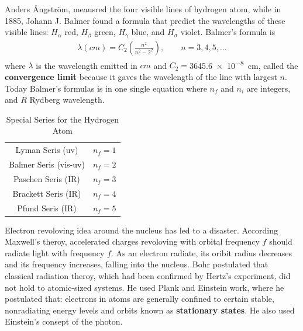         \bulletpar Anders \AA ngstr\"om, meausred the four visible lines of hydrogen atom, while in 1885, Johann J. Balmer found a formula that predict the wavelengths
        of these visible lines: $H_\alpha$ red, $H_\beta$ green, $H_\gamma$ blue, and $H_\sigma$ violet. Balmer's formula is
        \begin{align}
            \label{eq:Balmer formula:1}
            \lambda(cm) = C_2 \left( \frac{n^2}{n^2 - 2^2} \right), \qquad n=3, 4, 5, \dots 
        \end{align}
        where $\lambda$ is the wavelength emitted in $cm$ and $C_2=$\SI{3645.6e-8}{cm}, called the \textbf{convergence limit} because it gaves the wavelength of the line 
        with largest $n$. Today Balmer's formulas is in one single equation 
        where $n_f$ and $n_i$ are integers, and $R$ Rydberg wavelength.
        \begin{table}
            \centering
            \begin{tabular}{c c}
                \hline
                Lyman Seris (uv) & $n_f=1$ \\
                Balmer Seris (vis-uv) & $n_f=2$ \\
                Paschen Seris (IR) & $n_f=3$ \\
                Brackett Seris (IR) & $n_f=4$ \\
                Pfund Seris (IR) & $n_f=5$ \\
                \hline
            \end{tabular}
            \caption{\label{tab:Special Series for the Hydrogen Atom} Special Series for the Hydrogen Atom}
        \end{table}

        \bulletpar Electron revoloving idea around the nucleus has led to a disaster. According Maxwell's theroy, accelerated charges revoloving with orbital frequency $f$
        should radiate light with frequency $f$. As an electron radiate, its oribit radius decreases and its frequency increases, falling into the nucleus. Bohr postulated
        that classical radiation theroy, which had been confirmed by Hertz's experiment, did not hold to atomic-sized systems. He used Plank and Einstein work, where he 
        postulated that: electrons in atoms are generally confined to certain stable, nonradiating energy levels and orbits known as \textbf{stationary states}. He also 
        used Einstein's consept of the photon.

